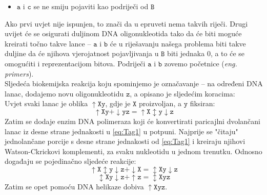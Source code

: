 \documentclass[a4paper,oneside,12pt]{memoir} %
\begin{document}
\begin{spacing}{1.5}
\begin{itemize}
\item $\mathtt{a}$ i $\mathtt{c}$ se ne smiju pojaviti kao podriječi od $\mathtt{B}$
\end{itemize}
Ako prvi uvjet nije ispunjen, to znači da u epruveti nema takvih riječi. Drugi uvijet će se osigurati duljinom DNA oligonukleotida tako da će biti moguće kreirati točno takve lance -- $\mathtt{a}$ i $\mathtt{b}$ će u riješavanju našega problema biti takve duljine da će njihova vjerojatnost pojavljivanja u $\mathtt{B}$ biti jednaka 0, a to će se omogućiti i reprezentacijom bitova. Podriječi $\mathtt{a}$ i $\mathtt{b}$ zovemo početnice (\textit{eng. primers}).\\[0.5cm]
Sljedeća biokemijska reakcija koju spominjemo je označavanje -- na određeni DNA lanac, dodajemo novu oligonukleotidu $\mathtt{z}$, a opisano je sljedećim koracima:\\
Uvjet svaki lanac je oblika $\mathtt{\uparrow Xy}$, gdje je $\mathtt{X}$ proizvoljan, a $\mathtt{y}$ fiksiran:
\begin{equation}
\label{eq:Tag1}
\mathtt{\uparrow Xy + \downarrow yz=\uparrow X \updownarrow y \downarrow z}
\end{equation}
Zatim se dodaje enzim DNA polimeraza koji će konvertirati paricajlni dvolančani lanac iz desne strane jednakosti u \ref{eq:Tag1} u potpuni. Najprije se "čitaju" jednolančane porcije s desne strane jednakosti od \ref{eq:Tag1} i kreiraju njihovi Watson-Ckrickovi komplementi, za svaku nukleotidu u jednom trenutku. Odnosno događaju se pojedinačno sljedeće reakcije:
\begin{equation}
\label{eq:Tag2}
\mathtt{\uparrow X \updownarrow y \downarrow z + \downarrow X = \updownarrow Xy \downarrow z}
\end{equation}
\begin{equation}
\label{eq:Tag3}
\mathtt{\updownarrow Xy \downarrow z + \uparrow z = \updownarrow Xyz}
\end{equation}
Zatim se opet pomoću DNA helikaze dobiva $\mathtt{\uparrow Xyz}$.

\end{spacing}
\end{document}
